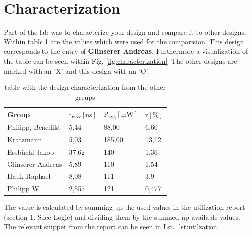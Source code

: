 \documentclass[%
	a4paper,
]
{article}
\begin{document}







\section{Characterization}
Part of the lab was to characterize your design and compare it to other designs. Within 
table \ref{tab:characterization} are the values which were used for the comparision. This 
design corresponds to the entry of \textbf{Glinserer Andreas}. Furthermore a visualization
of the table can be seen within Fig. \ref{fig:characterization}. The other designs are 
marked with an 'X' and this design with an 'O'. 
\begin{table}[ht]
    \centering
    \begin{tabular}{l|lll}
         Group & $\text{t}_\text{{max}} [\text{ns}]	$ & $\text{P}_\text{avg} [\text{mW}]$ & $\text{r} [\%] $ \\ \hline \hline
        Philipp, Benedikt &	5,44	& 88,00	& 6,60 \\
        Kratzmann &	5,03 &	185,00 & 13,12 \\
        Essbüchl Jakob &	37,62 &	140	& 1,36 \\
        Glinserer Andreas &	5,89 &	110	& 1,54 \\ 
        Hauk Raphael &	8,08 &	111 &	3,9 \\
        Philipp W. &	2,557 &	121 &	0,477\\
        \hline
    \end{tabular}
    \caption{table with the design characterization from the other groups}
    \label{tab:characterization}
\end{table}
The value is calculated by summing up the used values in the utilization report
(section 1. Slice Logic)
and dividing them
by the summed up available values. The relevant snippet from the report can be seen
in Lst. \ref{lst:utilzation}.
\end{document}
